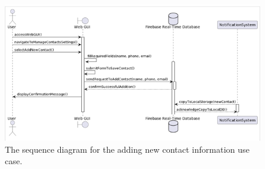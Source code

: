 \begin{figure}
    \centering
    \includegraphics[width=\imagewidth]{../assets/sequence/AddingNewContactInformationSequenceDiagram.png}
    \caption{The sequence diagram for the adding new contact information use case.}
    \label{fig:add-contact}
\end{figure}
